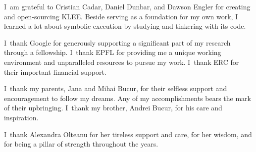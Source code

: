 I~am grateful to Cristian Cadar, Daniel Dunbar, and Dawson Engler for creating and open-sourcing KLEE.  Beside serving as a foundation for my own work, I learned a lot about symbolic execution by studying and tinkering with its code.


I~thank Google for generously supporting a significant part of my research through a fellowship.
%
I~thank EPFL for providing me a unique working environment and unparalleled resources to pursue my work.
%
I~thank ERC for their important financial support.


I~thank my parents, Jana and Mihai Bucur, for their selfless support and encouragement to follow my dreams.  Any of my accomplishments bears the mark of their upbringing.
%
I~thank my brother, Andrei Bucur, for his care and inspiration.


I~thank Alexandra Olteanu for her tireless support and care, for her wisdom, and for being a pillar of strength throughout the years.

